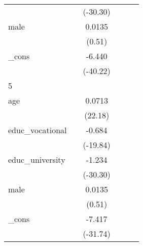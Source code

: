 {\begin{tabular}{l*{5}{c}}
            &                     &    (-30.30)         &                     &                     &                     \\
[1em]
male        &                     &      0.0135         &                     &                     &                     \\
            &                     &      (0.51)         &                     &                     &                     \\
[1em]
\_cons      &                     &      -6.440\sym{***}&                     &                     &                     \\
            &                     &    (-40.22)         &                     &                     &                     \\
\hline
5           &                     &                     &                     &                     &                     \\
age         &                     &      0.0713\sym{***}&                     &                     &                     \\
            &                     &     (22.18)         &                     &                     &                     \\
[1em]
educ\_vocational&                     &      -0.684\sym{***}&                     &                     &                     \\
            &                     &    (-19.84)         &                     &                     &                     \\
[1em]
educ\_university&                     &      -1.234\sym{***}&                     &                     &                     \\
            &                     &    (-30.30)         &                     &                     &                     \\
[1em]
male        &                     &      0.0135         &                     &                     &                     \\
            &                     &      (0.51)         &                     &                     &                     \\
[1em]
\_cons      &                     &      -7.417\sym{***}&                     &                     &                     \\
            &                     &    (-31.74)         &                     &                     &                     \\

\end{tabular}}
